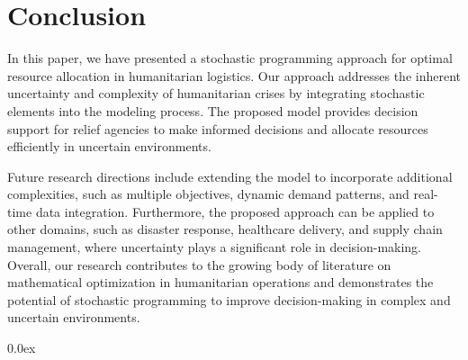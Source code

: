\documentclass[ijds,sglanonrev]{informs4}
\begin{document}
\section{Conclusion}\label{sec:Conclusion}
In this paper, we have presented a stochastic programming approach for optimal resource allocation in humanitarian logistics. Our approach addresses the inherent uncertainty and complexity of humanitarian crises by integrating stochastic elements into the modeling process. The proposed model provides decision support for relief agencies to make informed decisions and allocate resources efficiently in uncertain environments.

Future research directions include extending the model to incorporate additional complexities, such as multiple objectives, dynamic demand patterns, and real-time data integration. Furthermore, the proposed approach can be applied to other domains, such as disaster response, healthcare delivery, and supply chain management, where uncertainty plays a significant role in decision-making. Overall, our research contributes to the growing body of literature on mathematical optimization in humanitarian operations and demonstrates the potential of stochastic programming to improve decision-making in complex and uncertain environments.

\begingroup \parindent 0pt \parskip 0.0ex \def\enotesize{\normalsize} \theendnotes \endgroup

%
%
%

\end{document}
